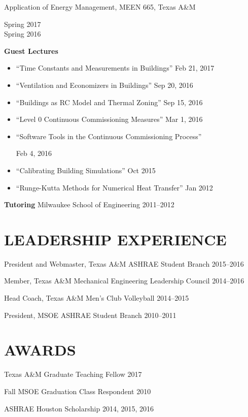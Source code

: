 \documentclass[margin]{res} %
\begin{document}
\begin{resume}
\vspace{10pt}

Application of Energy Management, MEEN 665, Texas A\&M \hfill \parbox[t]{2cm}{\raggedleft Spring 2017 \\ Spring 2016}

\vspace{10pt}
\textbf{Guest Lectures}
\begin{itemize}
    \item ``Time Constants and Measurements in Buildings'' \hfill Feb 21, 2017
    \item ``Ventilation and Economizers in Buildings'' \hfill Sep 20, 2016
    \item ``Buildings as RC Model and Thermal Zoning'' \hfill Sep 15, 2016
    \item ``Level 0 Continuous Commissioning Measures'' \hfill Mar 1, 2016
    \item  \parbox{10cm}{``Software Tools in the Continuous Commissioning Process''} \hfill Feb 4, 2016
    \item ``Calibrating Building Simulations'' \hfill Oct 2015
    \item ``Runge-Kutta Methods for Numerical Heat Transfer'' \hfill Jan 2012
\end{itemize}

\medskip


\textbf{Tutoring} \newline
Milwaukee School of Engineering \hfill 2011--2012

\section{LEADERSHIP EXPERIENCE}

President and Webmaster, Texas A\&M ASHRAE Student Branch \hfill 2015--2016

Member, Texas A\&M Mechanical Engineering Leadership Council \hfill 2014--2016

Head Coach, Texas A\&M Men's Club Volleyball \hfill 2014--2015\

President, MSOE ASHRAE Student Branch \hfill 2010--2011

\section{AWARDS}
Texas A\&M Graduate Teaching Fellow \hfill 2017

Fall MSOE Graduation Class Respondent \hfill 2010

ASHRAE Houston Scholarship \hfill 2014, 2015, 2016


\end{resume}
\end{document}
